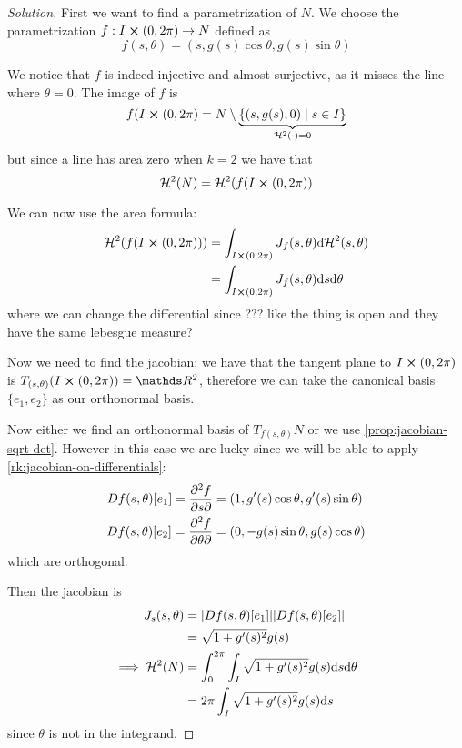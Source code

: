 \documentclass[12pt]{extarticle}
\begin{document}
\begin{proof}[Solution]
	First we want to find a parametrization of $N$.
	We choose the parametrization $f: I \cross (0, 2 \pi) \to N$ defined as
	\begin{equation}
		f(s, \theta) = (s, g(s) \cos \theta, g(s) \sin \theta)
	\end{equation}

	We notice that $f$ is indeed injective and almost surjective, as it misses the line where
	$\theta = 0$. The image of $f$ is
	\begin{equation}
		f(I \cross (0, 2\pi) =
		N \setminus \underbrace{\{ (s, g(s), 0) \mid s \in I \}}_{\mathcal H^2(\cdot) = 0}
	\end{equation}
	but since a line has area zero when $k = 2$ we have that
	\begin{equation}
		\mathcal H^2(N) = \mathcal H^2(f(I \cross (0, 2\pi))
	\end{equation}

	We can now use the area formula:
	\begin{align}
		\mathcal H^2(f(I \cross (0, 2\pi))) & = \int_{I \cross (0, 2\pi)} J_f(s, \theta) \dd \mathcal
		H^2(s, \theta)                                                                                    \\
		                                    & = \int_{I \cross (0, 2\pi)} J_f(s, \theta) \dd s \dd \theta
	\end{align}
	where we can change the differential since ??? like the thing is open and they have the same
	lebesgue measure?

	Now we need to find the jacobian: we have that the tangent plane to $I \cross (0, 2\pi)$ is
	$T_{(s, \theta)}(I\cross (0,2\pi)) = \R^2$, therefore we can take the canonical basis
	$\{ e_1, e_2 \}$ as our orthonormal basis.

	Now either we find an orthonormal basis of $T_{f(s, \theta)} N$ or we use
	\cref{prop:jacobian-sqrt-det}. However in this case we are lucky since we will be able to apply
	\cref{rk:jacobian-on-differentials}:
	\begin{align}
		Df(s, \theta)[e_1] = \pdv{f}{s}{}(s, \theta)      & = (1, g'(s) \cos \theta, g'(s) \sin \theta) \\
		Df(s, \theta)[e_2] = \pdv{f}{\theta}{}(s, \theta) & = (0, -g(s) \sin \theta, g(s) \cos \theta)
	\end{align}
	which are orthogonal.

	Then the jacobian is
	\begin{align}
		J_s(s, \theta)           & = \abs{Df(s, \theta)[e_1]} \abs{Df(s, \theta)[e_2]}           \\
		                         & = \sqrt{1+g'(s)^2} g(s)                                       \\
		\implies \mathcal H^2(N) & = \int_0^{2\pi} \int_I \sqrt{1+g'(s)^2} g(s) \dd s \dd \theta \\
		                         & = 2 \pi \int_I \sqrt{1+g'(s)^2} g(s) \dd s
	\end{align}
	since $\theta$ is not in the integrand.
\end{proof}
\end{document}
